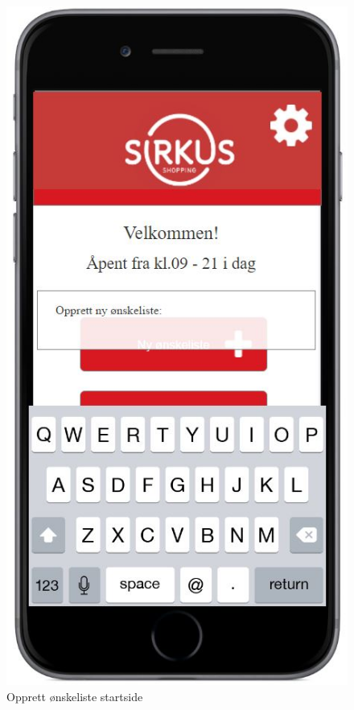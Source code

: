 \begin{figure}[H]
\includegraphics[scale=0.55]{images/axurebilder/opprett_onskeliste_hjem}
\centering %
\caption{Opprett ønskeliste startside}
\label{fig:opprett_onskeliste_hjem}
\end{figure}

